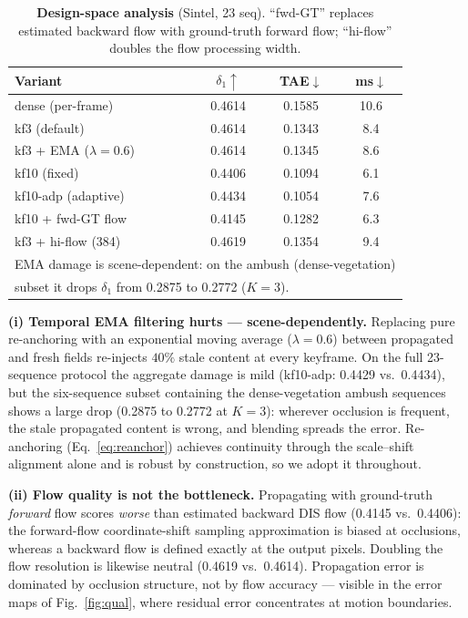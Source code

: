 \documentclass[10pt,twocolumn]{article}
\begin{document}
\begin{table}[t]
\centering\small
\setlength{\tabcolsep}{3.2pt}
\caption{\textbf{Design-space analysis} (Sintel, 23 seq). ``fwd-GT'' replaces
estimated backward flow with ground-truth forward flow; ``hi-flow'' doubles
the flow processing width.}
\label{tab:ablation}
\begin{tabular}{lccc}
\toprule
Variant & $\delta_1{\uparrow}$ & TAE$\downarrow$ & ms$\downarrow$\\
\midrule
dense (per-frame) & 0.4614 & 0.1585 & 10.6\\
kf3 (default) & 0.4614 & 0.1343 & 8.4\\
kf3 + EMA ($\lambda{=}0.6$) & 0.4614 & 0.1345 & 8.6\\
kf10 (fixed) & 0.4406 & 0.1094 & 6.1\\
kf10-adp (adaptive) & 0.4434 & 0.1054 & 7.6\\
kf10 + fwd-GT flow & 0.4145 & 0.1282 & 6.3\\
kf3 + hi-flow (384) & 0.4619 & 0.1354 & 9.4\\
\bottomrule
\multicolumn{4}{l}{\footnotesize EMA damage is scene-dependent: on the
ambush (dense-vegetation)}\\
\multicolumn{4}{l}{\footnotesize subset it drops $\delta_1$ from 0.2875 to
0.2772 ($K{=}3$).}\\
\end{tabular}
\end{table}

\textbf{(i) Temporal EMA filtering hurts --- scene-dependently.} Replacing
pure re-anchoring with an exponential moving average ($\lambda{=}0.6$)
between propagated and fresh fields re-injects $40\%$ stale content at every
keyframe. On the full 23-sequence protocol the aggregate damage is mild
(kf10-adp: 0.4429 vs.\ 0.4434), but the six-sequence subset containing the
dense-vegetation ambush sequences shows a large drop (0.2875 to 0.2772 at
$K{=}3$): wherever occlusion is frequent, the stale propagated content is
wrong, and blending spreads the error. Re-anchoring (Eq.~\ref{eq:reanchor})
achieves continuity through the scale--shift alignment alone and is robust
by construction, so we adopt it throughout.

\textbf{(ii) Flow quality is not the bottleneck.} Propagating with
ground-truth \emph{forward} flow scores \emph{worse} than estimated backward
DIS flow (0.4145 vs.\ 0.4406): the forward-flow coordinate-shift sampling
approximation is biased at occlusions, whereas a backward flow is defined
exactly at the output pixels. Doubling the flow resolution is likewise
neutral (0.4619 vs.\ 0.4614). Propagation error is dominated by occlusion
structure, not by flow accuracy --- visible in the error maps of
Fig.~\ref{fig:qual}, where residual error concentrates at motion boundaries.
\end{document}
